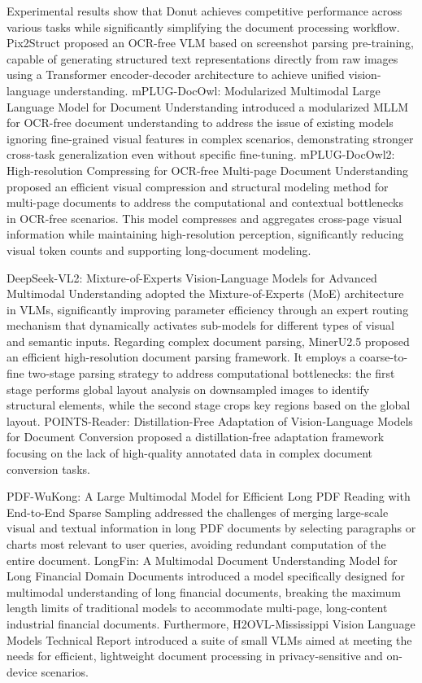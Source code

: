Experimental results show that Donut achieves competitive performance across various tasks while significantly simplifying the document processing workflow. Pix2Struct \cite{lee2023pix2struct} proposed an OCR-free VLM based on screenshot parsing pre-training, capable of generating structured text representations directly from raw images using a Transformer encoder-decoder architecture to achieve unified vision-language understanding.
mPLUG-DocOwl: Modularized Multimodal Large Language Model for Document Understanding \cite{ye2023docowl} introduced a modularized MLLM for OCR-free document understanding to address the issue of existing models ignoring fine-grained visual features in complex scenarios, demonstrating stronger cross-task generalization even without specific fine-tuning.
mPLUG-DocOwl2: High-resolution Compressing for OCR-free Multi-page Document Understanding \cite{ye2024docowl2} proposed an efficient visual compression and structural modeling method for multi-page documents to address the computational and contextual bottlenecks in OCR-free scenarios. This model compresses and aggregates cross-page visual information while maintaining high-resolution perception, significantly reducing visual token counts and supporting long-document modeling.

DeepSeek-VL2: Mixture-of-Experts Vision-Language Models for Advanced Multimodal Understanding \cite{deepseek2024vl2} adopted the Mixture-of-Experts (MoE) architecture in VLMs, significantly improving parameter efficiency through an expert routing mechanism that dynamically activates sub-models for different types of visual and semantic inputs. Regarding complex document parsing, MinerU2.5 \cite{liu2025mineru25} proposed an efficient high-resolution document parsing framework. It employs a coarse-to-fine two-stage parsing strategy to address computational bottlenecks: the first stage performs global layout analysis on downsampled images to identify structural elements, while the second stage crops key regions based on the global layout. POINTS-Reader: Distillation-Free Adaptation of Vision-Language Models for Document Conversion \cite{wang2025pointsreader} proposed a distillation-free adaptation framework focusing on the lack of high-quality annotated data in complex document conversion tasks.

PDF-WuKong: A Large Multimodal Model for Efficient Long PDF Reading with End-to-End Sparse Sampling \cite{li2024pdfwukong} addressed the challenges of merging large-scale visual and textual information in long PDF documents by selecting paragraphs or charts most relevant to user queries, avoiding redundant computation of the entire document. LongFin: A Multimodal Document Understanding Model for Long Financial Domain Documents \cite{chen2024longfin} introduced a model specifically designed for multimodal understanding of long financial documents, breaking the maximum length limits of traditional models to accommodate multi-page, long-content industrial financial documents. Furthermore, H2OVL-Mississippi Vision Language Models Technical Report \cite{h2ovl2024mississippi} introduced a suite of small VLMs aimed at meeting the needs for efficient, lightweight document processing in privacy-sensitive and on-device scenarios.

